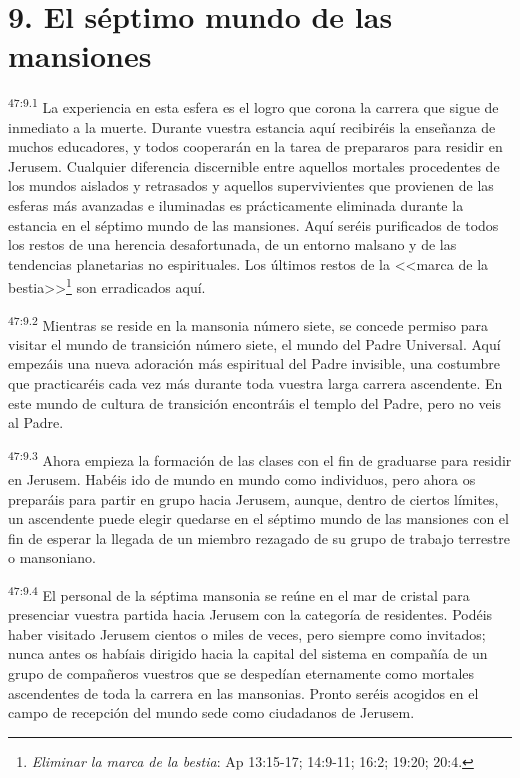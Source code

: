 \section*{9. El séptimo mundo de las mansiones}
\par
\textsuperscript{47:9.1} La experiencia en esta esfera es el logro que corona la carrera que sigue de inmediato a la muerte. Durante vuestra estancia aquí recibiréis la enseñanza de muchos educadores, y todos cooperarán en la tarea de prepararos para residir en Jerusem. Cualquier diferencia discernible entre aquellos mortales procedentes de los mundos aislados y retrasados y aquellos supervivientes que provienen de las esferas más avanzadas e iluminadas es prácticamente eliminada durante la estancia en el séptimo mundo de las mansiones. Aquí seréis purificados de todos los restos de una herencia desafortunada, de un entorno malsano y de las tendencias planetarias no espirituales. Los últimos restos de la <<marca de la bestia>>\footnote{\textit{Eliminar la marca de la bestia}: Ap 13:15-17; 14:9-11; 16:2; 19:20; 20:4.} son erradicados aquí.

\par
\textsuperscript{47:9.2} Mientras se reside en la mansonia número siete, se concede permiso para visitar el mundo de transición número siete, el mundo del Padre Universal. Aquí empezáis una nueva adoración más espiritual del Padre invisible, una costumbre que practicaréis cada vez más durante toda vuestra larga carrera ascendente. En este mundo de cultura de transición encontráis el templo del Padre, pero no veis al Padre.

\par
\textsuperscript{47:9.3} Ahora empieza la formación de las clases con el fin de graduarse para residir en Jerusem. Habéis ido de mundo en mundo como individuos, pero ahora os preparáis para partir en grupo hacia Jerusem, aunque, dentro de ciertos límites, un ascendente puede elegir quedarse en el séptimo mundo de las mansiones con el fin de esperar la llegada de un miembro rezagado de su grupo de trabajo terrestre o mansoniano.

\par
\textsuperscript{47:9.4} El personal de la séptima mansonia se reúne en el mar de cristal para presenciar vuestra partida hacia Jerusem con la categoría de residentes. Podéis haber visitado Jerusem cientos o miles de veces, pero siempre como invitados; nunca antes os habíais dirigido hacia la capital del sistema en compañía de un grupo de compañeros vuestros que se despedían eternamente como mortales ascendentes de toda la carrera en las mansonias. Pronto seréis acogidos en el campo de recepción del mundo sede como ciudadanos de Jerusem.

